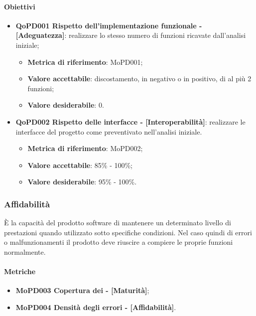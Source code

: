 \documentclass[../piano-di-qualifica.tex]{subfiles}
\begin{document}
\paragraph{Obiettivi}
\label{sub:obiettivi}
\begin{itemize}
    \item \textbf{QoPD001 Rispetto dell'implementazione funzionale - [Adeguatezza]}: realizzare lo stesso numero di funzioni ricavate dall'analisi iniziale;
        \begin{itemize}
            \item \textbf{Metrica di riferimento}: MoPD001;
            \item \textbf{Valore accettabile}: discostamento, in negativo o in positivo, di al più 2 funzioni;
            \item \textbf{Valore desiderabile}: 0.
        \end{itemize}
    \item \textbf{QoPD002 Rispetto delle interfacce - [Interoperabilità]}: realizzare le interfacce del progetto come preventivato nell'analisi iniziale.
        \begin{itemize}
            \item \textbf{Metrica di riferimento}: MoPD002;
            \item \textbf{Valore accettabile}: 85\% - 100\%;
            \item \textbf{Valore desiderabile}: 95\% - 100\%.
        \end{itemize}
\end{itemize}

\subsubsection{Affidabilità}%
\label{sub:affidabilita}
È la capacità del prodotto software di mantenere un determinato livello di prestazioni quando utilizzato sotto specifiche condizioni.
Nel caso quindi di errori o malfunzionamenti il prodotto deve riuscire a compiere le proprie funzioni normalmente.

\paragraph{Metriche}
\label{sub:metriche}
\begin{itemize}
    \item \textbf{MoPD003 Copertura dei  - [Maturità]};
    \item \textbf{MoPD004 Densità degli errori - [Affidabilità]}.
\end{itemize}
\end{document}
